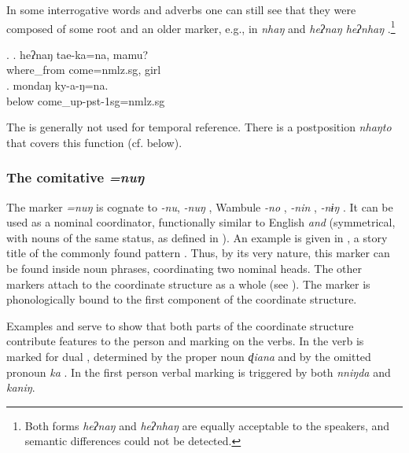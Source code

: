  
In some interrogative words and adverbs one can still see that they were composed of some root and an older  marker, e.g.,  in \emph{nhaŋ}  and \emph{heʔnaŋ \ti heʔnhaŋ} .\footnote{Both forms  \emph{heʔnaŋ} and \emph{heʔnhaŋ} are equally acceptable to the speakers, and semantic differences could not be detected.} 

\ex. \ag. heʔnaŋ tae-ka=na, mamu?\\
		where\_from come{=nmlz.sg}, girl\\
	\bg. mondaŋ ky-a-ŋ=na.\\
		below{\sc [abl]} come\_up{\sc -pst-1sg=nmlz.sg}\\
		
The  is generally not used for temporal reference. There is a postposition \emph{nhaŋto} that covers this function (cf.  below).
 

\subsubsection{The comitative  \emph{=nuŋ}}\label{case-com}

The  marker  \emph{=nuŋ} is cognate to  \emph{-nu},   \emph{-nuŋ} \citep[81]{Ebert1994The-structure}, Wambule \emph{-no} \citep[157]{Opgenort2004A-Grammar},  \emph{-nin} \citep[91]{Doornenbal2009A-grammar},  \emph{-nɨŋ} \citep[80]{Schikowski2012_Morphology}. It can be used as a nominal coordinator, functionally similar to English \emph{and}  (symmetrical, with nouns of the same status, as defined in  \citealt[3]{Haspelmath2004_overview}). An example is given in \Next[a], a story title of the commonly found pattern . Thus, by its very nature, this  marker can be found inside noun phrases, coordinating two nominal heads. The other  markers attach to the coordinate structure as a whole (see \Next[b]). The marker is phonologically bound to the first component of the coordinate structure.

Examples \Next[c] and \Next[d] serve to show that both parts of the  coordinate structure contribute features to the person and  marking on the verbs. In \Next[c] the verb is marked for dual , determined by the proper noun \emph{ɖiana} and by the omitted pronoun \emph{ka} . In \Next[d] the first person  verbal marking is triggered by both \emph{nniŋda} and \emph{kaniŋ}.

